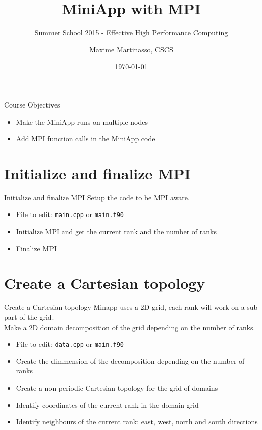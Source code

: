 \documentclass[aspectratio=43]{beamer}
\author{Maxime Martinasso, CSCS}
\title{MiniApp with MPI}
\subtitle{Summer School 2015 - Effective High Performance Computing}
\date{\today}
\begin{document}
\cscstitle

\begin{frame}{Course Objectives}
\begin{itemize}
\item Make the MiniApp runs on multiple nodes
\item Add MPI function calls in the MiniApp code
\end{itemize}
\end{frame}



\section{Initialize and finalize MPI}
\begin{frame}[fragile]{Initialize and finalize MPI}
Setup the code to be MPI aware.
\begin{itemize}
\item File to edit: \verb+main.cpp+ or \verb+main.f90+
\item Initialize MPI and get the current rank and the number of ranks
\item Finalize MPI
\end{itemize}
\end{frame}

\section{Create a Cartesian topology}
\begin{frame}[fragile]{Create a Cartesian topology}
Minapp uses a 2D grid, each rank will work on a sub part of the grid.\\
Make a 2D domain decomposition of the grid depending on the number of ranks.\\
\begin{itemize}
\item File to edit: \verb+data.cpp+ or \verb+main.f90+
\item Create the dimmension of the decomposition depending on the number of ranks
\item Create a non-periodic Cartesian topology for the grid of domains
\item Identify coordinates of the current rank in the domain grid
\item Identify neighbours of the current rank: east, west, north and south directions
\end{itemize}
\end{frame}
\end{document}
